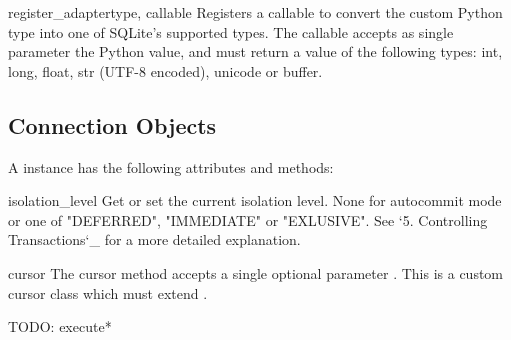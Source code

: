 \begin{funcdesc}{register_adapter}{type, callable}
Registers a callable to convert the custom Python type  into one of
SQLite's supported types. The callable  accepts as single
parameter the Python value, and must return a value of the following types:
int, long, float, str (UTF-8 encoded), unicode or buffer.
\end{funcdesc}


\subsection{Connection Objects \label{sqlite3-Connection-Objects}}

A  instance has the following attributes and methods:

\begin{memberdesc}{isolation_level}
  Get or set the current isolation level.  None for autocommit mode or one
  of "DEFERRED", "IMMEDIATE" or "EXLUSIVE".  See `5. Controlling
  Transactions`_ for a more detailed explanation.
\end{memberdesc}

\begin{methoddesc}{cursor}{}
  The cursor method accepts a single optional parameter .
  This is a custom cursor class which must extend .
\end{methoddesc}

TODO: execute*
